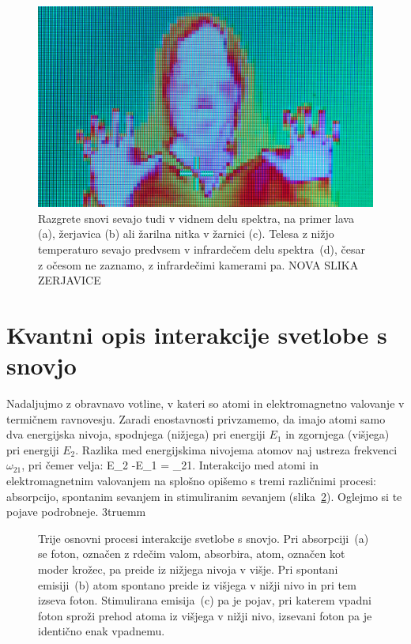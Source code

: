 \begin{figure}[ht]
\includegraphics[width=7truecm]{slike/11_photo_IR.jpg} 
\caption{Razgrete snovi sevajo tudi v 
vidnem delu spektra, na primer lava (a), žerjavica (b) ali 
žarilna nitka v žarnici (c). Telesa z nižjo temperaturo sevajo 
predvsem v infrardečem delu spektra~(d), česar z očesom ne zaznamo, z infrardečimi
kamerami pa. NOVA SLIKA ZERJAVICE}
\label{fig:11_photoPlanck}
\end{figure}

\section{Kvantni opis interakcije svetlobe s snovjo}
Nadaljujmo z obravnavo votline, v kateri so atomi 
in elektromagnetno valovanje v termičnem ravnovesju. 
Zaradi enostavnosti privzamemo, da imajo atomi samo dva 
energijska nivoja, spodnjega (nižjega) pri energiji
$E_1$ in zgornjega (višjega) pri energiji $E_2$. 
Razlika med energijskima nivojema atomov naj ustreza
frekvenci $\omega_{21}$, pri čemer velja:
\beq
E_2 -E_1 = \hslash \omega_{21}.
\label{eq:11_07}
\eeq
Interakcijo med atomi in elektromagnetnim valovanjem na splošno
opišemo s tremi različnimi procesi: absorpcijo, spontanim
sevanjem in stimuliranim sevanjem (slika~\ref{fig:11_procesi}). 
Oglejmo si te pojave podrobneje.
\vglue3truemm
\begin{figure}[h!]
\centering
\def\svgwidth{145truemm} 

\caption{Trije osnovni procesi interakcije svetlobe s snovjo. Pri absorpciji~(a) 
se foton, označen z rdečim valom, absorbira, atom, označen kot moder krožec, pa 
preide iz nižjega nivoja v višje. Pri spontani emisiji~(b) atom spontano preide 
iz višjega v nižji nivo in pri tem izseva foton. Stimulirana emisija~(c) pa je pojav,
pri katerem vpadni foton sproži prehod atoma iz višjega v nižji nivo, 
izsevani foton pa je identično enak vpadnemu.
}
\label{fig:11_procesi}
\end{figure}

